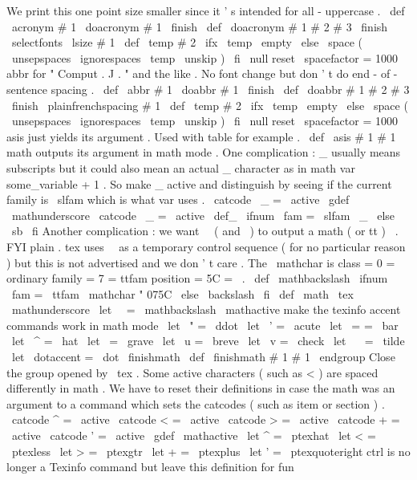 {{We
print
this
one
point
size
smaller
since
it
'
s
intended
for
%
all
-
uppercase
.
%
\
def
\
acronym
#
1
{
\
doacronym
#
1
\
finish
}
\
def
\
doacronym
#
1
#
2
#
3
\
finish
{
%
{
\
selectfonts
\
lsize
#
1
}
%
\
def
\
temp
{
#
2
}
%
\
ifx
\
temp
\
empty
\
else
\
space
(
{
\
unsepspaces
\
ignorespaces
\
temp
\
unskip
}
)
%
\
fi
\
null
%
reset
\
spacefactor
=
1000
}
%
abbr
for
"
Comput
.
J
.
"
and
the
like
.
%
No
font
change
but
don
'
t
do
end
-
of
-
sentence
spacing
.
%
\
def
\
abbr
#
1
{
\
doabbr
#
1
\
finish
}
\
def
\
doabbr
#
1
#
2
#
3
\
finish
{
%
{
\
plainfrenchspacing
#
1
}
%
\
def
\
temp
{
#
2
}
%
\
ifx
\
temp
\
empty
\
else
\
space
(
{
\
unsepspaces
\
ignorespaces
\
temp
\
unskip
}
)
%
\
fi
\
null
%
reset
\
spacefactor
=
1000
}
%
asis
just
yields
its
argument
.
Used
with
table
for
example
.
%
\
def
\
asis
#
1
{
#
1
}
%
math
outputs
its
argument
in
math
mode
.
%
%
One
complication
:
_
usually
means
subscripts
but
it
could
also
mean
%
an
actual
_
character
as
in
math
{
var
{
some_variable
}
+
1
}
.
So
make
%
_
active
and
distinguish
by
seeing
if
the
current
family
is
\
slfam
%
which
is
what
var
uses
.
{
\
catcode
\
_
=
\
active
\
gdef
\
mathunderscore
{
%
\
catcode
\
_
=
\
active
\
def_
{
\
ifnum
\
fam
=
\
slfam
\
_
\
else
\
sb
\
fi
}
%
}
}
%
Another
complication
:
we
want
\
\
(
and
\
)
to
output
a
math
(
or
tt
)
\
.
%
FYI
plain
.
tex
uses
\
\
as
a
temporary
control
sequence
(
for
no
%
particular
reason
)
but
this
is
not
advertised
and
we
don
'
t
care
.
%
%
The
\
mathchar
is
class
=
0
=
ordinary
family
=
7
=
ttfam
position
=
5C
=
\
.
\
def
\
mathbackslash
{
\
ifnum
\
fam
=
\
ttfam
\
mathchar
"
075C
\
else
\
backslash
\
fi
}
%
\
def
\
math
{
%
\
tex
\
mathunderscore
\
let
\
\
=
\
mathbackslash
\
mathactive
%
make
the
texinfo
accent
commands
work
in
math
mode
\
let
\
"
=
\
ddot
\
let
\
'
=
\
acute
\
let
\
=
=
\
bar
\
let
\
^
=
\
hat
\
let
\
=
\
grave
\
let
\
u
=
\
breve
\
let
\
v
=
\
check
\
let
\
~
=
\
tilde
\
let
\
dotaccent
=
\
dot
\
finishmath
}
\
def
\
finishmath
#
1
{
#
1
\
endgroup
}
%
Close
the
group
opened
by
\
tex
.
%
Some
active
characters
(
such
as
<
)
are
spaced
differently
in
math
.
%
We
have
to
reset
their
definitions
in
case
the
math
was
an
argument
%
to
a
command
which
sets
the
catcodes
(
such
as
item
or
section
)
.
%
{
\
catcode
^
=
\
active
\
catcode
<
=
\
active
\
catcode
>
=
\
active
\
catcode
+
=
\
active
\
catcode
'
=
\
active
\
gdef
\
mathactive
{
%
\
let
^
=
\
ptexhat
\
let
<
=
\
ptexless
\
let
>
=
\
ptexgtr
\
let
+
=
\
ptexplus
\
let
'
=
\
ptexquoteright
}
}
%
ctrl
is
no
longer
a
Texinfo
command
but
leave
this
definition
for
fun
}}
